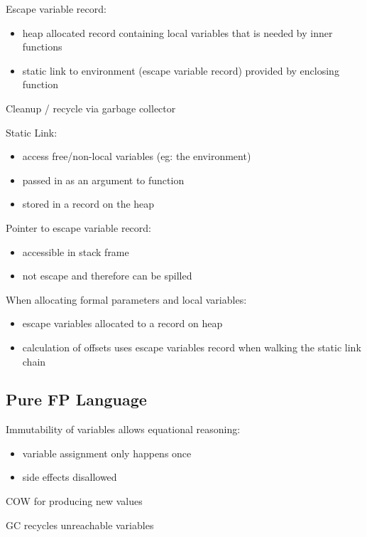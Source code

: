 \documentclass[8pt]{extarticle}
\begin{document}
\begin{multicols*}{2}
  Escape variable record:
  \begin{itemize}
  \item heap allocated record containing local variables that is needed by inner functions
  \item static link to environment (escape variable record) provided by enclosing function
  \end{itemize}
  
  Cleanup / recycle via garbage collector

  Static Link:
  \begin{itemize}
  \item access free/non-local variables (eg: the environment)
  \item passed in as an argument to function
  \item stored in a record on the heap
  \end{itemize}

  Pointer to escape variable record:
  \begin{itemize}
  \item accessible in stack frame
  \item not escape and therefore can be spilled
  \end{itemize}

  When allocating formal parameters and local variables:
  \begin{itemize}
  \item escape variables allocated to a record on heap
  \item calculation of offsets uses escape variables record when walking the static link chain
  \end{itemize}

  \subsection{Pure FP Language}
  
  Immutability of variables allows equational reasoning:
  \begin{itemize}
  \item variable assignment only happens once
  \item side effects disallowed
  \end{itemize}

  COW for producing new values
  
  GC recycles unreachable variables


\end{multicols*}
\end{document}

